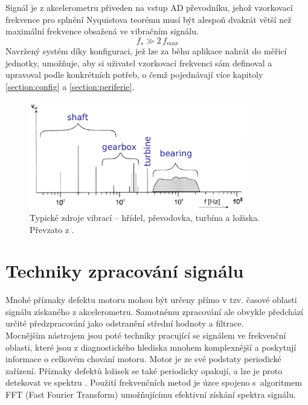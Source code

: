     Signál je z akcelerometru přiveden na vstup AD převodníku, jehož vzorkovací frekvence pro splnění Nyquistova teorému musí být alespoň dvakrát větší než maximální frekvence obsažená ve vibračním signálu. 
    \begin{equation}
        f_s \gg 2\,f_{max}
    \end{equation}
    Navržený systém díky konfiguraci, jež lze za běhu aplikace nahrát do měřicí jednotky, umožňuje, aby si uživatel vzorkovací frekvenci sám definoval a upravoval podle konkrétních potřeb, o čemž pojednávají více kapitoly \ref{section:config} a \ref{section:periferie}.
    
     \begin{figure} [!h]
        \centering
        \caption{Typické zdroje vibrací – hřídel, převodovka, turbína a ložiska. Převzato z \cite{prez:2}.}
        \label{figure:vibration}
        \includegraphics[width=0.85\textwidth]{DSP/Figs/vibrations.png}
    \end{figure} 

    
\section{Techniky zpracování signálu}
\label{section:techniky}
    Mnohé příznaky defektu motoru mohou být určeny přímo v tzv. časové oblasti signálu získaného z akcelerometru. Samotnému zpracování ale obvykle předchází určité předzpracování jako odstranění střední hodnoty a filtrace.\\
    Mocnějším nástrojem jsou poté techniky pracující se signálem ve frekvenční oblasti, které jsou z diagnostického hlediska mnohem komplexnější a poskytují informace o celkovém chování motoru. Motor je ze své podstaty periodické zařízení. Příznaky defektů ložisek se také periodicky opakují, a lze je proto detekovat ve spektru \cite{book:2}. Použití frekvenčních metod je úzce spojeno s~algoritmem FFT (Fast Fourier Transform) umožňujícímu efektivní získání spektra signálu.
    
